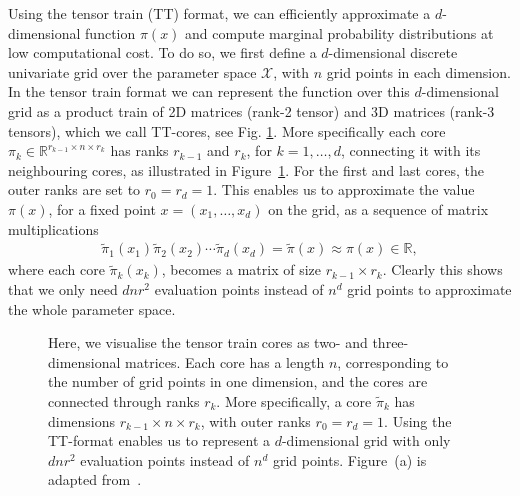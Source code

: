 Using the tensor train (TT) format, we can efficiently approximate a $d$-dimensional function $\pi(x)$ and compute marginal probability distributions at low computational cost. To do so, we first define a $d$-dimensional discrete univariate grid over the parameter space $\mathcal{X}$, with $n$ grid points in each dimension.
In the tensor train format we can represent the function over this $d$-dimensional grid as a product train of 2D matrices (rank-2 tensor) and 3D matrices (rank-3 tensors), which we call TT-cores, see Fig. \ref{fig:TTfig}. More specifically each core $\pi_k \in \mathbb{R}^{r_{k-1} \times n \times r_k}$ has ranks $r_{k-1}$ and $r_k$, for $k = 1, \dots, d$, connecting it with its neighbouring cores, as illustrated in Figure~\ref{fig:TTfig}.
For the first and last cores, the outer ranks are set to $r_0 = r_d = 1$.
This enables us to approximate the value $\pi(x)$, for a fixed point $x = (x_1, \dots, x_d)$ on the grid, as a sequence of matrix multiplications 
\begin{align*}
\tilde{\pi}_1(x_1)  \tilde{\pi}_2(x_2)  \cdots \tilde{\pi}_d(x_d) = \tilde{\pi}(x) \approx	\pi(x)  \in \mathbb{R},
\end{align*}
where each core $\tilde{\pi}_k(x_k)$, becomes a matrix of size $r_{k-1} \times r_k$.
Clearly this shows that we only need $dnr^2$ evaluation points instead of $n^d$ grid points to approximate the whole parameter space.
\begin{figure}[ht!]
	\centering
\begin{subfigure}{\textwidth}
	
	\caption{}
\end{subfigure}
	\centering
\begin{subfigure}{\textwidth}
	\caption{}
\end{subfigure}
\caption[Visualisation of a tensor train]{Here, we visualise the tensor train cores as two- and three-dimensional matrices. 
Each core has a length $n$, corresponding to the number of grid points in one dimension, and the cores are connected through ranks $r_k$. 
More specifically, a core $\tilde{\pi}_k$ has dimensions $r_{k-1} \times n \times r_k$, with outer ranks $r_0 = r_d = 1$.
Using the TT-format enables us to represent a $d$-dimensional grid with only $dnr^2$ evaluation points instead of $n^d$ grid points.
Figure~(a) is adapted from~\cite{fox2021grid}.}
\label{fig:TTfig}
\end{figure}
